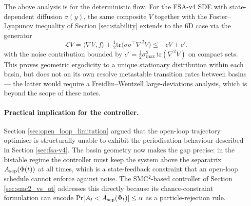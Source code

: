 The above analysis is for the deterministic flow. For the FSA-v4 SDE with state-dependent diffusion $\sigma(y)$, the same composite $V$ together with the Foster--Lyapunov inequality of Section \ref{sec:stability} extends to the 6D case via the generator
\[
\mathcal{L} V = \langle \nabla V, f \rangle + \tfrac12 \mathrm{tr}\big(\sigma \sigma^\top \nabla^2 V\big) \le -c V + c',
\]
with the noise contribution bounded by $c' = \tfrac12 \sigma_{\max}^2 \, \mathrm{tr}(\nabla^2 V)$ on compact sets. This proves geometric ergodicity to a unique stationary distribution within each basin, but does not on its own resolve metastable transition rates between basins --- the latter would require a Freidlin--Wentzell large-deviations analysis, which is beyond the scope of these notes.

\paragraph{Practical implication for the controller.}
Section \ref{sec:open_loop_limitation} argued that the open-loop trajectory optimiser is structurally unable to exhibit the periodisation behaviour described in Section \ref{sec:fsa-v4}. The basin geometry now makes the gap precise: in the bistable regime the controller must keep the system above the separatrix $A_{\rm sep}(\Phi(t))$ at all times, which is a state-feedback constraint that an open-loop schedule cannot enforce against noise. The SMC$^2$-based controller of Section \ref{sec:smc2_vs_ot} addresses this directly because its chance-constraint formulation can encode $\Pr[A_t < A_{\rm sep}(\Phi_t)] \le \alpha$ as a particle-rejection rule.
